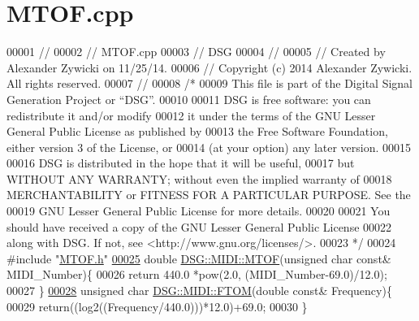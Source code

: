 \hypertarget{_m_t_o_f_8cpp_source}{\section{M\+T\+O\+F.\+cpp}
\label{_m_t_o_f_8cpp_source}
}

\begin{DoxyCode}
00001 \textcolor{comment}{//}
00002 \textcolor{comment}{//  MTOF.cpp}
00003 \textcolor{comment}{//  DSG}
00004 \textcolor{comment}{//}
00005 \textcolor{comment}{//  Created by Alexander Zywicki on 11/25/14.}
00006 \textcolor{comment}{//  Copyright (c) 2014 Alexander Zywicki. All rights reserved.}
00007 \textcolor{comment}{//}
00008 \textcolor{comment}{/*}
00009 \textcolor{comment}{ This file is part of the Digital Signal Generation Project or “DSG”.}
00010 \textcolor{comment}{}
00011 \textcolor{comment}{ DSG is free software: you can redistribute it and/or modify}
00012 \textcolor{comment}{ it under the terms of the GNU Lesser General Public License as published by}
00013 \textcolor{comment}{ the Free Software Foundation, either version 3 of the License, or}
00014 \textcolor{comment}{ (at your option) any later version.}
00015 \textcolor{comment}{}
00016 \textcolor{comment}{ DSG is distributed in the hope that it will be useful,}
00017 \textcolor{comment}{ but WITHOUT ANY WARRANTY; without even the implied warranty of}
00018 \textcolor{comment}{ MERCHANTABILITY or FITNESS FOR A PARTICULAR PURPOSE.  See the}
00019 \textcolor{comment}{ GNU Lesser General Public License for more details.}
00020 \textcolor{comment}{}
00021 \textcolor{comment}{ You should have received a copy of the GNU Lesser General Public License}
00022 \textcolor{comment}{ along with DSG.  If not, see <http://www.gnu.org/licenses/>.}
00023 \textcolor{comment}{ */}
00024 \textcolor{preprocessor}{#include "\hyperlink{_m_t_o_f_8h}{MTOF.h}"}
\hypertarget{_m_t_o_f_8cpp_source_l00025}{}\hyperlink{namespace_d_s_g_1_1_m_i_d_i_af0ba40e3fd85269f6f69d0418fbbaea8}{00025} \textcolor{keywordtype}{double} \hyperlink{namespace_d_s_g_1_1_m_i_d_i_af0ba40e3fd85269f6f69d0418fbbaea8}{DSG::MIDI::MTOF}(\textcolor{keywordtype}{unsigned} \textcolor{keywordtype}{char} \textcolor{keyword}{const}& MIDI\_Number)\{
00026     \textcolor{keywordflow}{return} 440.0 *pow(2.0, (MIDI\_Number-69.0)/12.0);
00027 \}
\hypertarget{_m_t_o_f_8cpp_source_l00028}{}\hyperlink{namespace_d_s_g_1_1_m_i_d_i_a79d20f3aac00c6da9b9baed252c04b98}{00028} \textcolor{keywordtype}{unsigned} \textcolor{keywordtype}{char} \hyperlink{namespace_d_s_g_1_1_m_i_d_i_a79d20f3aac00c6da9b9baed252c04b98}{DSG::MIDI::FTOM}(\textcolor{keywordtype}{double} \textcolor{keyword}{const}& Frequency)\{
00029     \textcolor{keywordflow}{return}((log2((Frequency/440.0)))*12.0)+69.0;
00030 \}
\end{DoxyCode}
